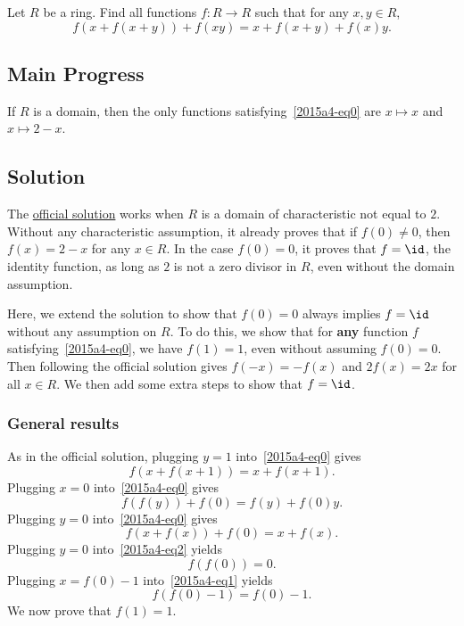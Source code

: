 Let $R$ be a ring.
Find all functions $f : R \to R$ such that for any $x, y \in R$,
\[ f(x + f(x + y)) + f(xy) = x + f(x + y) + f(x) y. \tag{*}\label{2015a4-eq0} \]



\subsection*{Main Progress}

If $R$ is a domain, then the only functions satisfying~\eqref{2015a4-eq0} are $x \mapsto x$ and $x \mapsto 2 - x$.



\subsection*{Solution}

The \href{https://www.imo-official.org/problems/IMO2015SL.pdf}{official solution} works when $R$ is a domain of characteristic not equal to $2$.
Without any characteristic assumption, it already proves that if $f(0) \neq 0$, then $f(x) = 2 - x$ for any $x \in R$.
In the case $f(0) = 0$, it proves that $f = \id$, the identity function, as long as $2$ is not a zero divisor in $R$, even without the domain assumption.

Here, we extend the solution to show that $f(0) = 0$ always implies $f = \id$ without any assumption on $R$.
To do this, we show that for \textbf{any} function $f$ satisfying~\eqref{2015a4-eq0}, we have $f(1) = 1$, even without assuming $f(0) = 0$.
Then following the official solution gives $f(-x) = -f(x)$ and $2 f(x) = 2x$ for all $x \in R$.
We then add some extra steps to show that $f = \id$.



\subsubsection*{General results}

As in the official solution, plugging $y = 1$ into~\eqref{2015a4-eq0} gives
\[ f(x + f(x + 1)) = x + f(x + 1). \tag{1}\label{2015a4-eq1} \]
Plugging $x = 0$ into~\eqref{2015a4-eq0} gives
\[ f(f(y)) + f(0) = f(y) + f(0) y. \tag{2}\label{2015a4-eq2} \]
Plugging $y = 0$ into~\eqref{2015a4-eq0} gives
\[ f(x + f(x)) + f(0) = x + f(x). \tag{3}\label{2015a4-eq3} \]
Plugging $y = 0$ into~\eqref{2015a4-eq2} yields
\[ f(f(0)) = 0. \tag{4}\label{2015a4-eq4} \]
Plugging $x = f(0) - 1$ into~\eqref{2015a4-eq1} yields
\[ f(f(0) - 1) = f(0) - 1. \tag{5}\label{2015a4-eq5} \]
We now prove that $f(1) = 1$.

